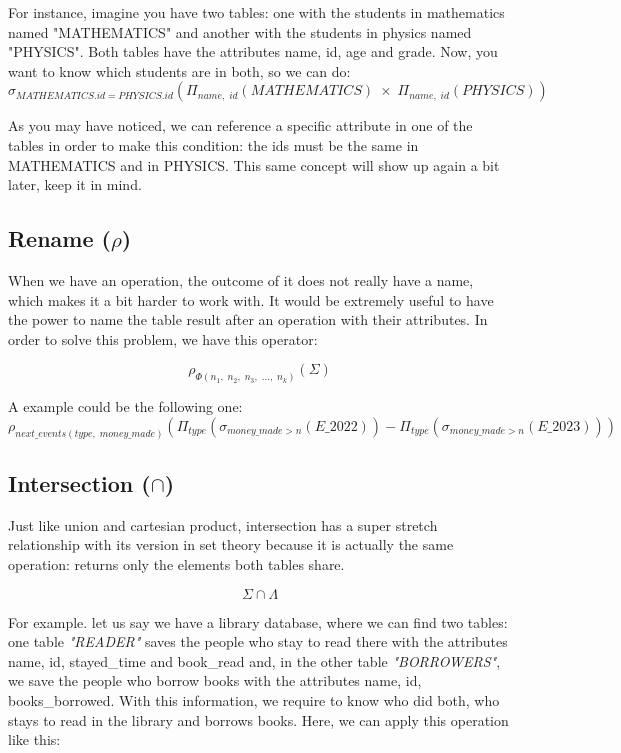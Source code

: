 \documentclass[12pt]{article}
\begin{document}
For instance, imagine you have two tables: one with the students in mathematics named "MATHEMATICS" and another with the students in physics named "PHYSICS". Both tables have the attributes name, id, age and grade. Now, you want to know which students are in both, so we can do:
\[
    \sigma_{MATHEMATICS.id=PHYSICS.id}(\Pi_{name,\;id}(MATHEMATICS) \;\times\; \Pi_{name,\;id}(PHYSICS))
\]

As you may have noticed, we can reference a specific attribute in one of the tables in order to make this condition: the ids must be the same in MATHEMATICS and in PHYSICS. This same concept will show up again a bit later, keep it in mind.

\subsection{Rename (\( \rho \))}

When we have an operation, the outcome of it does not really have a name, which makes it a bit harder to work with. It would be extremely useful to have the power to name the table result after an operation with their attributes. In order to solve this problem, we have this operator:

\[
\rho_{\Phi(n_1,\;n_2,\;n_3,\;...,\;n_k)}(\Sigma)
\]

A example could be the following one:
\[
    \rho_{next\_events(type,\;money\_made)}(\Pi_{type}(\sigma_{money\_made>n}(E\_2022)) - \Pi_{type}(\sigma_{money\_made>n}(E\_2023)))
\]

\subsection{Intersection (\( \cap \))}

Just like union and cartesian product, intersection has a super stretch relationship with its version in set theory because it is actually the same operation: returns only the elements both tables share.

\[
    \Sigma \cap \Lambda
\]

For example. let us say we have a library database, where we can find two tables: one table \emph{"READER"} saves the people who stay to read there with the attributes name, id, stayed\_time and book\_read and, in the other table \emph{"BORROWERS"}, we save the people who borrow books with the attributes name, id, books\_borrowed. With this information, we require to know who did both, who stays to read in the library and borrows books. Here, we can apply this operation like this:
\end{document}
